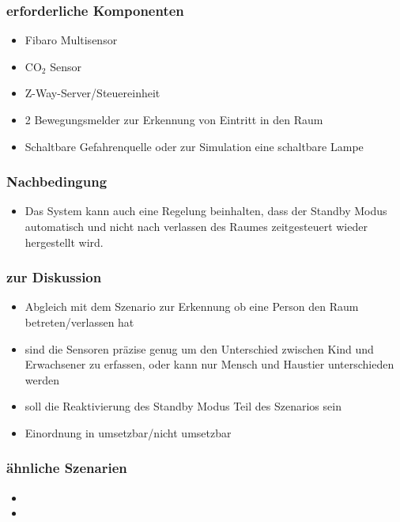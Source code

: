 \subsubsection{erforderliche Komponenten}
\begin{itemize}
	\item Fibaro Multisensor
	\item CO$_2$ Sensor
	\item Z-Way-Server/Steuereinheit
	\item 2 Bewegungsmelder zur Erkennung von Eintritt in den Raum
	\item Schaltbare Gefahrenquelle oder zur Simulation eine schaltbare Lampe
\end{itemize}

\subsubsection{Nachbedingung}
\begin{itemize}
	\item Das System kann auch eine Regelung beinhalten, dass der Standby Modus automatisch und nicht nach verlassen des Raumes zeitgesteuert wieder hergestellt wird.
\end{itemize}

\subsubsection{zur Diskussion}
\begin{itemize}
	\item Abgleich mit dem Szenario zur Erkennung ob eine Person den Raum betreten/verlassen hat
	\item sind die Sensoren präzise genug um den Unterschied zwischen Kind und Erwachsener zu erfassen, oder kann nur Mensch und Haustier unterschieden werden
	\item soll die Reaktivierung des Standby Modus Teil des Szenarios sein
	\item Einordnung in umsetzbar/nicht umsetzbar
\end{itemize}

\subsubsection{ähnliche Szenarien}
\begin{itemize}
	\item {}
	\item {}
\end{itemize}

